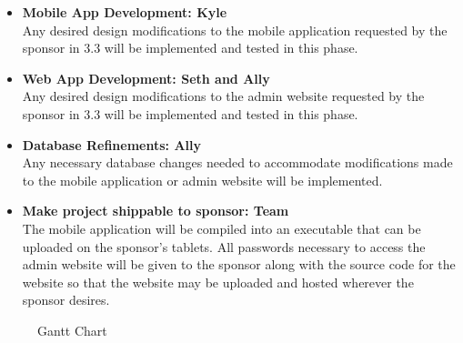 \documentclass[Letter,11pt]{article}
\begin{document}
		\begin{itemize}
			\item\textbf{Mobile App Development: Kyle}\\
			Any desired design modifications to the mobile application requested by the sponsor in 3.3 will be implemented and tested in this phase. \\
			\item \textbf{Web App Development: Seth and Ally }\\
			Any desired design modifications to the admin website requested by the sponsor in 3.3 will be implemented and tested in this phase. \\
			
			\item\textbf{Database Refinements: Ally}\\
			Any necessary database changes needed to accommodate modifications made to the mobile application or admin website will be implemented. \\
			
			\item\textbf{Make project shippable to sponsor: Team}\\
			The mobile application will be compiled into an executable that can be uploaded on the sponsor’s tablets.  All passwords necessary to access the admin website will be given to the sponsor along with the source code for the website so that the website may be uploaded and hosted wherever the sponsor desires. 

			
		\end{itemize}
		
		\begin{landscape}
			\begin{figure}
				
				\caption{\label{fig:gant}Gantt Chart}
			\end{figure}
		\end{landscape}
	
\end{document}
